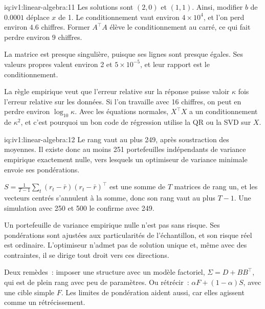 \begin{solution}{iq:iv1:linear-algebra:11}
Les solutions sont $(2, 0)$ et $(1, 1)$. Ainsi, modifier $b$ de $0.0001$ déplace $x$ de 1. Le conditionnement vaut environ $4 \times 10^4$, et l'on perd environ $4.6$ chiffres. Former $A^\top A$ élève le conditionnement au carré, ce qui fait perdre environ $9$ chiffres.

La matrice est presque singulière, puisque ses lignes sont presque égales. Ses valeurs propres valent environ 2 et $5 \times 10^{-5}$, et leur rapport est le conditionnement.

La règle empirique veut que l'erreur relative sur la réponse puisse valoir $\kappa$ fois l'erreur relative sur les données. Si l'on travaille avec 16 chiffres, on peut en perdre environ $\log_{10}\kappa$. Avec les équations normales, $X^\top X$ a un conditionnement de $\kappa^2$, et c'est pourquoi un bon code de régression utilise la QR ou la SVD sur $X$.

\end{solution}

\begin{solution}{iq:iv1:linear-algebra:12}
Le rang vaut au plus 249, après soustraction des moyennes. Il existe donc au moins 251 portefeuilles indépendants de variance empirique exactement nulle, vers lesquels un optimiseur de variance minimale envoie ses pondérations.

$S = \frac{1}{T - 1}\sum_t (r_t - \bar{r})(r_t - \bar{r})^\top$ est une somme de $T$ matrices de rang un, et les vecteurs centrés s'annulent à la somme, donc son rang vaut au plus $T - 1$. Une simulation avec 250 et 500 le confirme avec 249.

Un portefeuille de variance empirique nulle n'est pas sans risque. Ses pondérations sont ajustées aux particularités de l'échantillon, et son risque réel est ordinaire. L'optimiseur n'admet pas de solution unique et, même avec des contraintes, il se dirige tout droit vers ces directions.

Deux remèdes~: imposer une structure avec un modèle factoriel, $\Sigma = D + BB^\top$, qui est de plein rang avec peu de paramètres. Ou rétrécir~: $\alpha F + (1 - \alpha)S$, avec une cible simple $F$. Les limites de pondération aident aussi, car elles agissent comme un rétrécissement.

\end{solution}

